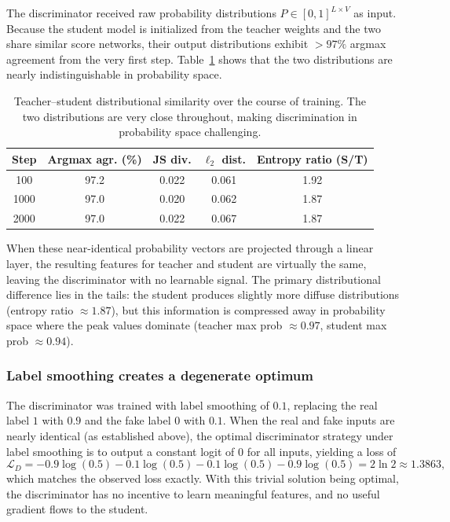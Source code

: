 \documentclass{article}
\begin{document}
The discriminator received raw probability distributions $P \in [0,1]^{L \times V}$ as input. Because the student model is initialized from the teacher weights and the two share similar score networks, their output distributions exhibit $> 97\%$ argmax agreement from the very first step. Table~\ref{tab:dist_quality} shows that the two distributions are nearly indistinguishable in probability space.

\begin{table}[t]
\centering
\caption{Teacher--student distributional similarity over the course of training. The two distributions are very close throughout, making discrimination in probability space challenging.}
\label{tab:dist_quality}
\begin{tabular}{ccccc}
\toprule
\textbf{Step} & \textbf{Argmax agr. (\%)} & \textbf{JS div.} & \textbf{$\ell_2$ dist.} & \textbf{Entropy ratio (S/T)} \\
\midrule
100  & 97.2 & 0.022 & 0.061 & 1.92 \\
1000 & 97.0 & 0.020 & 0.062 & 1.87 \\
2000 & 97.0 & 0.022 & 0.067 & 1.87 \\
\bottomrule
\end{tabular}
\end{table}

When these near-identical probability vectors are projected through a linear layer, the resulting features for teacher and student are virtually the same, leaving the discriminator with no learnable signal. The primary distributional difference lies in the tails: the student produces slightly more diffuse distributions (entropy ratio $\approx 1.87$), but this information is compressed away in probability space where the peak values dominate (teacher max prob $\approx 0.97$, student max prob $\approx 0.94$).

\subsubsection{Label smoothing creates a degenerate optimum}

The discriminator was trained with label smoothing of $0.1$, replacing the real label $1$ with $0.9$ and the fake label $0$ with $0.1$. When the real and fake inputs are nearly identical (as established above), the optimal discriminator strategy under label smoothing is to output a constant logit of $0$ for all inputs, yielding a loss of
\begin{equation}
\mathcal{L}_D = -0.9 \log(0.5) - 0.1 \log(0.5) - 0.1 \log(0.5) - 0.9 \log(0.5) = 2 \ln 2 \approx 1.3863,
\end{equation}
which matches the observed loss exactly. With this trivial solution being optimal, the discriminator has no incentive to learn meaningful features, and no useful gradient flows to the student.
\end{document}
